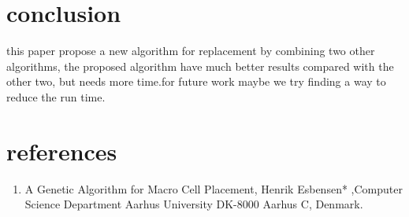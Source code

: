 \documentclass[conference]{IEEEtran}
\begin{document}
\section{conclusion}
this paper propose a new algorithm for replacement by combining two other algorithms, the proposed algorithm have much better results compared with the other two, but needs more time.\newline for future work maybe we try finding a way to reduce the run time.
\section{references}
\begin{enumerate} 
\item A Genetic Algorithm for Macro Cell Placement, Henrik Esbensen*
,Computer Science Department Aarhus University DK-8000 Aarhus C, Denmark.

\end{enumerate}
\end{document}
